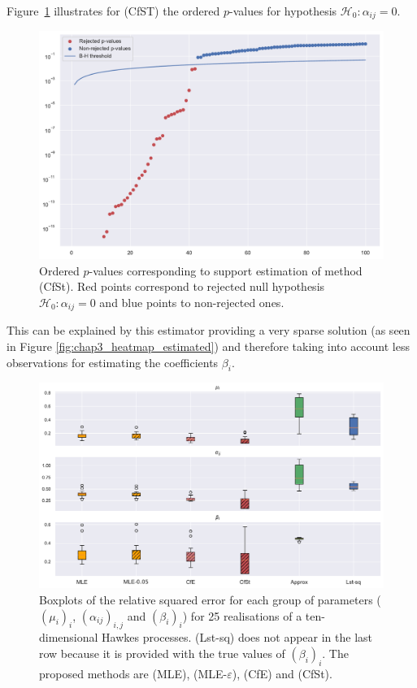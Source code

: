 Figure~\ref{fig:chap3_p_values_support} illustrates for (CfST) the ordered $p$-values for hypothesis $\mathcal{H}_0 : \alpha_{ij} = 0$.

{\begin{figure}[!ht]
     \centering
     \includegraphics[width=0.75\linewidth]{images/chapter3/p_values_10.pdf}
     \caption{Ordered $p$-values corresponding to support estimation of method (CfSt). Red points correspond to rejected null hypothesis $\mathcal{H}_0 : \alpha_{ij} = 0$ and blue points to non-rejected ones.}
     \label{fig:chap3_p_values_support}
     \end{figure}}

This can be explained by this estimator providing a very sparse solution (as seen in Figure \ref{fig:chap3_heatmap_estimated}) and therefore taking into account less observations for estimating the coefficients $\beta_i$.

{\begin{figure}[!ht]
     \centering
     \includegraphics[width=0.9\linewidth]{images/chapter3/boxplots_10_dim.pdf}
     \caption{Boxplots of the relative squared error for each group of parameters ($(\mu_i)_i$, $(\alpha_{ij})_{i,j}$ and $(\beta_i)_i$) for 25 realisations of a ten-dimensional Hawkes processes.
    (Lst-sq) does not appear in the last row because it is provided with the true values of \((\beta_i)_i\).
    The proposed methods are (MLE), (MLE-$\varepsilon$), (CfE) and (CfSt).}
     \label{fig:chap3_errors_10_dim}
     \end{figure}}

